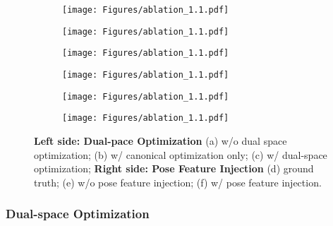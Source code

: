 \begin{figure}[tb]
    \centering
    \begin{subfigure}{0.15\linewidth}
        \texttt{[image: Figures/ablation\_1.1.pdf]}
        \caption{}
        \label{fig:ablation1-a}
    \end{subfigure}
    \hfill
    \begin{subfigure}{0.15\linewidth}
        \texttt{[image: Figures/ablation\_1.1.pdf]}
        \caption{}
        \label{fig:ablation1-b}
    \end{subfigure}
    \hfill
    \begin{subfigure}{0.15\linewidth}
        \texttt{[image: Figures/ablation\_1.1.pdf]}
        \caption{}
        \label{fig:ablation1-c}
    \end{subfigure}
    \hfill
    \begin{subfigure}{0.15\linewidth}
        \texttt{[image: Figures/ablation\_1.1.pdf]}
        \caption{}
        \label{fig:ablation1-d}
    \end{subfigure}
    \hfill
    \begin{subfigure}{0.15\linewidth}
        \texttt{[image: Figures/ablation\_1.1.pdf]}
        \caption{}
        \label{fig:ablation1-e}
    \end{subfigure}
    \hfill
    \begin{subfigure}{0.15\linewidth}
        \texttt{[image: Figures/ablation\_1.1.pdf]}
        \caption{}
        \label{fig:ablation1-f}
    \end{subfigure}

    \caption{\textbf{Left side: Dual-pace Optimization} (a) w/o dual space optimization; (b) w/ canonical optimization only; (c) w/ dual-space optimization; \textbf{Right side: Pose Feature Injection} (d) ground truth; (e) w/o pose feature injection; (f) w/ pose feature injection.}
    \vspace{-3mm}
    \label{fig:ablation1}
\end{figure}

\subsubsection{Dual-space Optimization} 

